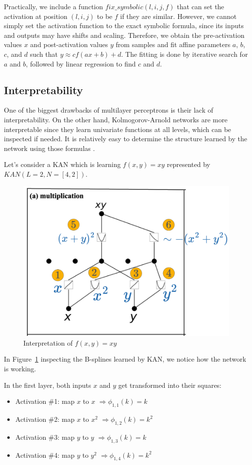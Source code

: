Practically, we include a function $fix\_symbolic(l,i,j,f)$ that can set the activation at position $(l, i, j)$ to be $f$ if they are similar. 
However, we cannot simply set the activation function to the exact symbolic formula, since its inputs and outputs may have shifts and scaling. 
Therefore, we obtain the pre-activation values $x$ and post-activation values $y$ from samples and fit affine parameters $a$, $b$, $c$, and $d$ such that $y \approx c f(a x + b) + d$. The fitting is done by iterative search for $a$ and $b$, followed by linear regression to find $c$ and $d$. 

\subsection{Interpretability}
\label{sec:interpre}
One of the biggest drawbacks of multilayer perceptrons is their lack of interpretability. On the other hand, Kolmogorov-Arnold networks are more interpretable since they learn univariate functions at all levels, which can be inspected if needed. It is relatively easy to determine the structure learned by the network using those formulas \cite{kan_intro}.

Let's consider a KAN which is learning $f(x,y)=xy$ represented by $KAN(L=2,N=[4, 2])$.

\begin{figure}[H]
    \centering
    \includegraphics[width=0.5\linewidth]{LATEX//Images/interpr.png}
    \caption{Interpretation of $f(x,y)=xy$}
    \label{fig:interp}
\end{figure}

In Figure~\ref{fig:interp} inspecting the B-splines learned by KAN, we notice how the network is working.

In the first layer, both inputs $x$ and $y$ get transformed into their squares:
\begin{itemize}
    \item Activation \#1: map $x$ to $x$ $\Rightarrow \phi_{1,1}(k) = k $ 
    \item Activation \#2: map $x$ to $x^2$ $\Rightarrow \phi_{1,2}(k) = k^2$ 
    \item Activation \#3: map $y$ to $y$ $\Rightarrow \phi_{1,3}(k) = k$ 
    \item Activation \#4: map $y$ to $y^2$ $\Rightarrow \phi_{1,4}(k) = k^2$ 
\end{itemize}

